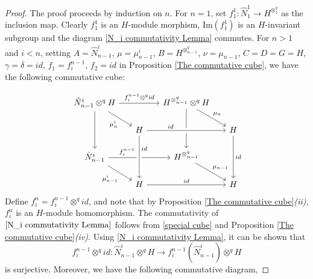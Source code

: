 \documentclass[12pt]{elsarticle}
\newtheorem*{main corollary*}{Main Corollary}
\theoremstyle{definition}
\newcommand{\tens}{
	\otimes^q}
\newcommand{\im}[1]{\text{Im}{(#1)}}
\begin{document}
 \begin{proof}
     The proof proceeds by induction on $n$. For $n=1$, set $f_1^1:\hat{N}^1_{1} \to H^{\otimes^{q}_{1}}$ as the inclusion map. Clearly $f_1^1$ is an $H$-module morphism, $\im{f_1^1}$ is an $H$-invariant subgroup and the diagram \eqref{N_i commutativity Lemma} commutes. For $n>1$ and $i<n$, setting $A=\hat{N}^i_{n-1}$, $\mu=\mu_{n-1}^i$, $B=H^{\otimes^q_{n-1}}$, $\nu=\mu_{n-1}$, $C=D=G=H$, $\gamma=\delta=id$, $f_1=f_i^{n-1}$, $f_2=id$ in Proposition \ref{The commutative cube}, we have the following commutative cube:


     
 \begin{equation}\label{special cube}
   \begin{tikzcd}[row sep=1.5em, column sep = 1.5em]
  \hat{N}^i_{n-1}\tens H \arrow[rr,"f_i^{n-1}\tens id"] \arrow[dr,swap,"\mu_n^i"] \arrow[dd, swap] &&
  H^{\otimes^q_{n-1}}\tens H \arrow[dd, pos=.3] \arrow[dr,"\mu_n"] \\
   & H \arrow[rr, pos=.3,"id", crossing over] &&
   H \arrow[dd,"id"] \\
\hat{N}^i_{n-1} \arrow[rr,"f_i^{n-1}",pos=.3] \arrow[dr, swap,"\mu_{n-1}^i"] && H^{\otimes^q_{n-1}}\arrow[dr,"\mu_{n-1}"] \\
   & H \arrow[rr,"id"] \arrow[from=uu,"id", pos=.3, crossing over]&& H
    \end{tikzcd}
\end{equation}Define $f_i^n=f_i^{n-1}\tens id$, and note that by Proposition \ref{The commutative cube}\textit{(ii)}, $f_i^n$ is an $H$-module homomorphism. The commutativity of $\eqref{N_i commutativity Lemma}$ follows from \eqref{special cube} and Proposition \ref{The commutative cube}\textit{(iv)}. Using \eqref{N_i commutativity Lemma}, it can be shown that \[f_i^{n-1}\tens id:\hat{N}^i_{n-1}\tens H \to f_i^{n-1}(\hat{N}^i_{n-1})\tens H\] is surjective. Moreover, we have the following commutative diagram,


\end{proof}
\end{document}
